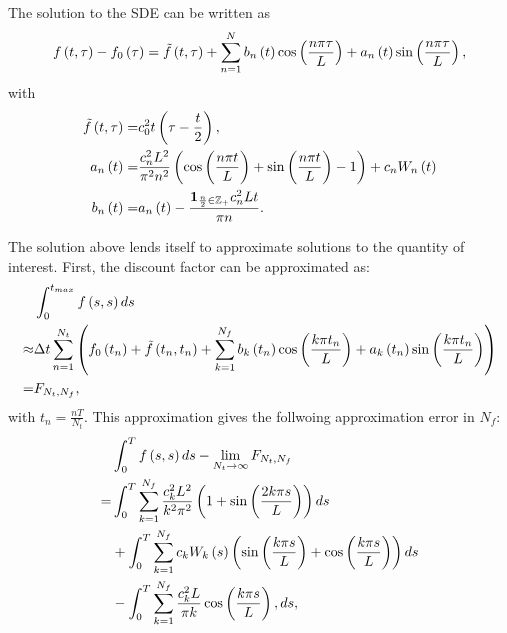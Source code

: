 \documentclass[11pt]{amsart}
\begin{document}
The solution to the SDE can be written as
\begin{align*}
f \left( {t,\tau} \right) - f_0 \left( {\tau} \right)
= \tilde f \left( {t,\tau} \right)
+ \displaystyle\sum\limits_{n=1}^{N} b_n \left( {t} \right) \cos \left( {\frac{n \pi \tau}{L}} \right) + a_n \left( {t} \right) \sin \left( {\frac{n \pi \tau}{L}} \right),
\end{align*}
with
\begin{align}
\tilde f \left( {t,\tau} \right) =& c_0^2 t \left( {\tau-\frac{t}{2}} \right),
\\
a_n \left( {t} \right) =& \frac{c_n^2 L^2}{\pi^2 n^2} \left( {\cos \left( {\frac{n \pi t}{L}} \right) + \sin \left( {\frac{n \pi t}{L}} \right)-1 } \right) + c_n W_n \left( {t} \right)
\\
b_n \left( {t} \right) =& a_n \left( {t} \right) -  \frac{\mathbf{1}_{\frac{n}{2} \in \mathbb Z_+}  c_n^2 L t}{\pi n}.
\end{align}

The solution above lends itself to approximate solutions to the quantity of interest.
First, the discount factor can be approximated as:
\begin{align*}
&\int_0^{t_{max}} f \left( {s,s} \right) ds
\\
\approx& \Delta t \displaystyle\sum\limits_{n=1}^{N_t} \left( { f_0 \left( {t_n} \right) + \tilde f \left( {t_n, t_n} \right) +
\displaystyle\sum\limits_{k=1}^{N_f}
b_k \left( {t_n} \right) \cos \left( {\frac{k \pi t_n}{L}} \right) + a_k \left( {t_n} \right) \sin \left( {\frac{k \pi t_n}{L}} \right)
} \right)
\\
=& F_{N_t,N_f}
,
\end{align*}
with $t_n = \frac{nT}{N_t}$.
This approximation gives the follwoing approximation error
in $N_f$:
\begin{align*}
&\int_0^{T} f \left( {s,s} \right) ds -\lim_{N_t \rightarrow \infty} F_{N_t,N_f}
\\
=& \int_0^T \displaystyle\sum\limits_{k=1}^{N_f}
\frac{c_k^2 L^2}{k^2 \pi^2}
\left( {1+ \sin \left( {\frac{2 k \pi s}{L}} \right)} \right) ds
\\
&+
 \int_0^T \displaystyle\sum\limits_{k=1}^{N_f} c_k W_k \left( {s} \right)
\left( {\sin \left( {\frac{ k \pi s}{L}} \right) + \cos \left( {\frac{ k \pi s}{L}} \right)} \right)
ds
\\
&-
\int_0^T \displaystyle\sum\limits_{k=1}^{N_f}
\frac{c_k^2 L}{\pi k} \cos \left( {\frac{ k \pi s}{L}} \right),
ds,
\end{align*}
\end{document}
